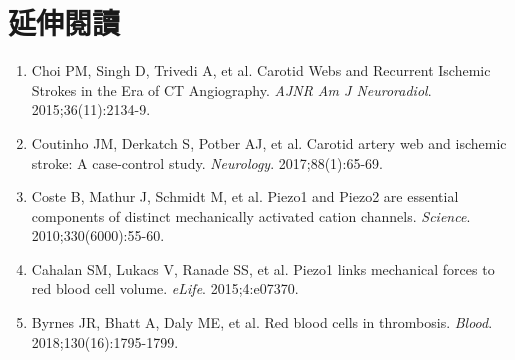 \documentclass[12pt,a4paper]{article}
\begin{document}
\section{延伸閱讀}

\begin{enumerate}
    \item Choi PM, Singh D, Trivedi A, et al. Carotid Webs and Recurrent Ischemic Strokes in the Era of CT Angiography. \textit{AJNR Am J Neuroradiol}. 2015;36(11):2134-9.

    \item Coutinho JM, Derkatch S, Potber AJ, et al. Carotid artery web and ischemic stroke: A case-control study. \textit{Neurology}. 2017;88(1):65-69.

    \item Coste B, Mathur J, Schmidt M, et al. Piezo1 and Piezo2 are essential components of distinct mechanically activated cation channels. \textit{Science}. 2010;330(6000):55-60.

    \item Cahalan SM, Lukacs V, Ranade SS, et al. Piezo1 links mechanical forces to red blood cell volume. \textit{eLife}. 2015;4:e07370.

    \item Byrnes JR, Bhatt A, Daly ME, et al. Red blood cells in thrombosis. \textit{Blood}. 2018;130(16):1795-1799.
\end{enumerate}
\end{document}
